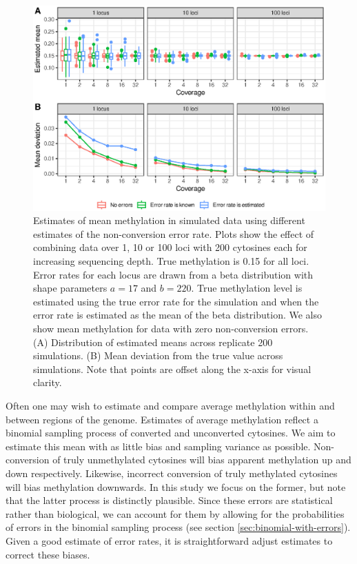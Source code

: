 \documentclass[twocolumn,twoside,lettersize]{article}
\begin{document}
\begin{figure}
  \begin{center}
    \includegraphics{figure3.eps}
    \caption{
        Estimates of mean methylation in simulated data using different estimates of the non-conversion error rate.
        Plots show the effect of combining data over 1, 10 or 100 loci with 200 cytosines each for increasing sequencing depth.
        True methylation is 0.15 for all loci.
        Error rates for each locus are drawn from a beta distribution with shape parameters $a=17$ and $b=220$.
        True methylation level is estimated using the true error rate for the simulation and when the error rate is estimated as the mean of the beta distribution.
        We also show mean methylation for data with zero non-conversion errors.
        (A) Distribution of estimated means across replicate 200 simulations.
        (B) Mean deviation from the true value across simulations.
        Note that points are offset along the x-axis for visual clarity.
    }
    \label{fig:simulations}
  \end{center}
\end{figure}

Often one may wish to estimate and compare average methylation within and between regions of the genome.
Estimates of average methylation reflect a binomial sampling process of converted and unconverted cytosines.
We aim to estimate this mean with as little bias and sampling variance as possible.
Non-conversion of truly unmethylated cytosines will bias apparent methylation up and down respectively.
Likewise, incorrect conversion of truly methylated cytosines will bias methylation downwards.
In this study we focus on the former, but note that the latter process is distinctly plausible.
Since these errors are statistical rather than biological, we can account for them by allowing for the probabilities of errors in the binomial sampling process (see section \ref{sec:binomial-with-errors}).
Given a good estimate of error rates, it is straightforward adjust estimates to correct these biases.
\end{document}
